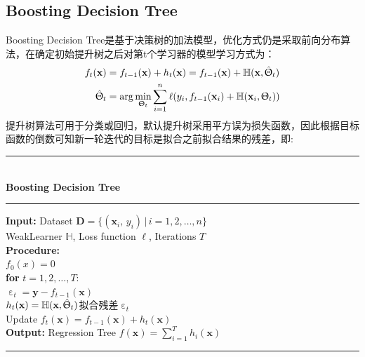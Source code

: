\documentclass[a4paper]{article}
\begin{document}
	\subsection{Boosting Decision Tree}
		Boosting Decision Tree是基于决策树的加法模型，优化方式仍是采取前向分布算法，在确定初始提升树之后对第t个学习器的模型学习方式为：
		\begin{align*}
			f_t(\textbf{x}) 		& = f_{t-1}(\textbf{x}) + h_t(\textbf{x}) = f_{t-1}(\textbf{x}) + \mathbb{H}(\textbf{x},\hat{\Uptheta}_t)\\
				\hat{\Uptheta}_t  	& = \arg\min_{\Uptheta_t}\sum_{i=1}^{n}\ell(y_i, f_{t-1}(\textbf{x}_i)+\mathbb{H}(\textbf{x}_i,\Uptheta_t))
		\end{align*}
		提升树算法可用于分类或回归，默认提升树采用平方误为损失函数，因此根据目标函数的倒数可知新一轮迭代的目标是拟合之前拟合结果的残差，即:\\
		\noindent\rule[0.10\baselineskip]{\textwidth}{0.75pt}\\
		\textbf{Boosting Decision Tree}\\
		\noindent\rule[0.10\baselineskip]{\textwidth}{0.5pt}
		\textbf{Input:}	Dataset $\textbf{D} = \{(\textbf{x}_i,\,y_i)\,|\,i = 1, 2,\dots, n\}$\\
		\hspace*{32pt}	WeakLearner $\mathbb{H}$, Loss function $\ell$, Iterations $T$\\
		\textbf{Procedure:} \\
				\hspace*{32pt} $f_0(x) = 0$\\
				\hspace*{32pt} \textbf{for} $t = 1, 2,\dots, T$:\\
						\hspace*{48pt} $\upepsilon_t = \textbf{y} - f_{t-1}(\textbf{x})$\\
						\hspace*{48pt} $h_t(\textbf{x}) = \mathbb{H}(\textbf{x},\hat{\Uptheta}_t)$拟合残差$\upepsilon_t$\\
						\hspace*{48pt} Update $f_t(\textbf{x}) = f_{t-1}(\textbf{x})+h_t(\textbf{x})$\\
		\textbf{Output:} Regression Tree $f(\textbf{x}) = \sum_{i=1}^{T}h_i(\textbf{x})$\\
		\noindent\rule[0.10\baselineskip]{\textwidth}{0.75pt}\\
\end{document}
